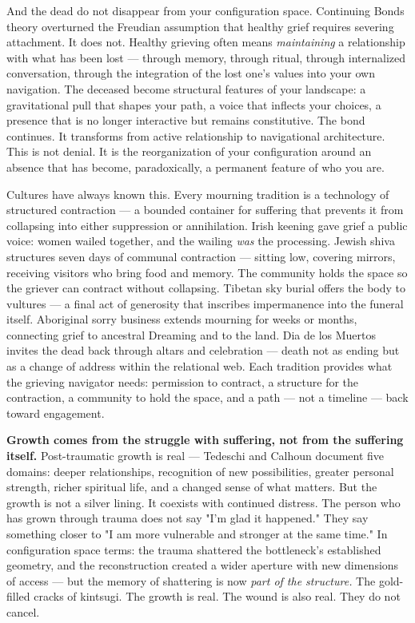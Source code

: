 And the dead do not disappear from your configuration space. Continuing Bonds theory overturned the Freudian assumption that healthy grief requires severing attachment. It does not. Healthy grieving often means \textit{maintaining} a relationship with what has been lost — through memory, through ritual, through internalized conversation, through the integration of the lost one's values into your own navigation. The deceased become structural features of your landscape: a gravitational pull that shapes your path, a voice that inflects your choices, a presence that is no longer interactive but remains constitutive. The bond continues. It transforms from active relationship to navigational architecture. This is not denial. It is the reorganization of your configuration around an absence that has become, paradoxically, a permanent feature of who you are.


Cultures have always known this. Every mourning tradition is a technology of structured contraction — a bounded container for suffering that prevents it from collapsing into either suppression or annihilation. Irish keening gave grief a public voice: women wailed together, and the wailing \textit{was} the processing. Jewish shiva structures seven days of communal contraction — sitting low, covering mirrors, receiving visitors who bring food and memory. The community holds the space so the griever can contract without collapsing. Tibetan sky burial offers the body to vultures — a final act of generosity that inscribes impermanence into the funeral itself. Aboriginal sorry business extends mourning for weeks or months, connecting grief to ancestral Dreaming and to the land. Dia de los Muertos invites the dead back through altars and celebration — death not as ending but as a change of address within the relational web. Each tradition provides what the grieving navigator needs: permission to contract, a structure for the contraction, a community to hold the space, and a path — not a timeline — back toward engagement.


\textbf{Growth comes from the struggle with suffering, not from the suffering itself.} Post-traumatic growth is real — Tedeschi and Calhoun document five domains: deeper relationships, recognition of new possibilities, greater personal strength, richer spiritual life, and a changed sense of what matters. But the growth is not a silver lining. It coexists with continued distress. The person who has grown through trauma does not say "I'm glad it happened." They say something closer to "I am more vulnerable and stronger at the same time." In configuration space terms: the trauma shattered the bottleneck's established geometry, and the reconstruction created a wider aperture with new dimensions of access — but the memory of shattering is now \textit{part of the structure.} The gold-filled cracks of kintsugi. The growth is real. The wound is also real. They do not cancel.


